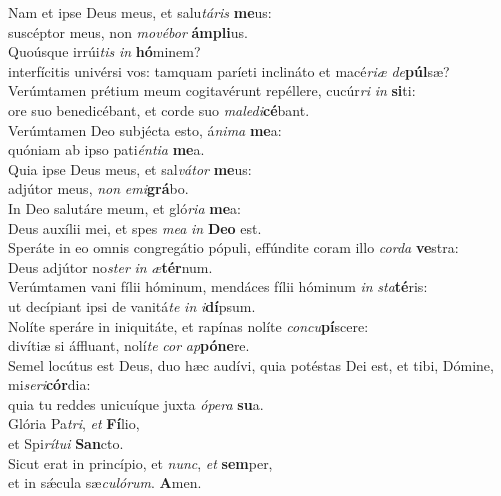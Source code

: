 \evenverse Nam et ipse Deus meus, et salu\textit{tá}\textit{ris} \textbf{me}us:~\*\\
\evenverse suscéptor meus, non \textit{mo}\textit{vé}\textit{bor} \textbf{ám}\textbf{pli}us.\\
\oddverse Quoúsque irrúi\textit{tis} \textit{in} \textbf{hó}minem?~\*\\
\oddverse interfícitis univérsi vos: tamquam paríeti inclináto et macé\textit{ri}\textit{æ} \textit{de}\textbf{púl}sæ?\\
\evenverse Verúmtamen prétium meum cogitavérunt repéllere, cucúr\textit{ri} \textit{in} \textbf{si}ti:~\*\\
\evenverse ore suo benedicébant, et corde suo \textit{ma}\textit{le}\textit{di}\textbf{cé}bant.\\
\oddverse Verúmtamen Deo subjécta esto, á\textit{ni}\textit{ma} \textbf{me}a:~\*\\
\oddverse quóniam ab ipso pati\textit{én}\textit{ti}\textit{a} \textbf{me}a.\\
\evenverse Quia ipse Deus meus, et sal\textit{vá}\textit{tor} \textbf{me}us:~\*\\
\evenverse adjútor meus, \textit{non} \textit{e}\textit{mi}\textbf{grá}bo.\\
\oddverse In Deo salutáre meum, et gló\textit{ri}\textit{a} \textbf{me}a:~\*\\
\oddverse Deus auxílii mei, et spes \textit{me}\textit{a} \textit{in} \textbf{De}\textbf{o} est.\\
\evenverse Speráte in eo omnis congregátio pópuli, effúndite coram illo \textit{cor}\textit{da} \textbf{ve}stra:~\*\\
\evenverse Deus adjútor no\textit{ster} \textit{in} \textit{æ}\textbf{tér}num.\\
\oddverse Verúmtamen vani fílii hóminum, mendáces fílii hóminum \textit{in} \textit{sta}\textbf{té}ris:~\*\\
\oddverse ut decípiant ipsi de vanitá\textit{te} \textit{in} \textit{i}\textbf{dí}psum.\\
\evenverse Nolíte speráre in iniquitáte, et rapínas nolíte \textit{con}\textit{cu}\textbf{pí}scere:~\*\\
\evenverse divítiæ si áffluant, nolí\textit{te} \textit{cor} \textit{ap}\textbf{pó}\textbf{ne}re.\\
\oddverse Semel locútus est Deus, duo hæc audívi, quia potéstas Dei est, et tibi, Dómine, mi\textit{se}\textit{ri}\textbf{cór}dia:~\*\\
\oddverse quia tu reddes unicuíque juxta \textit{ó}\textit{pe}\textit{ra} \textbf{su}a.\\
\evenverse Glória Pa\textit{tri}, \textit{et} \textbf{Fí}lio,~\*\\
\evenverse et Spi\textit{rí}\textit{tu}\textit{i} \textbf{San}cto.\\
\oddverse Sicut erat in princípio, et \textit{nunc}, \textit{et} \textbf{sem}per,~\*\\
\oddverse et in sǽcula sæ\textit{cu}\textit{ló}\textit{rum}. \textbf{A}men.\\
